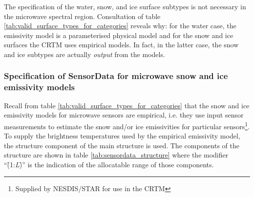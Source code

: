 The specification of the water, snow, and ice surface subtypes is not necessary in the microwave spectral region. Consultation of table \ref{tab:valid_surface_types_for_categories} reveals why: for the water case, the emissivity model is a parameterised physical model and for the snow and ice surfaces the CRTM uses empirical models. In fact, in the latter case, the snow and ice subtypes are actually \emph{output} from the models.



\subsubsection{Specification of SensorData for microwave snow and ice emissivity models}

Recall from table \ref{tab:valid_surface_types_for_categories} that the snow and ice emissivity models for microwave sensors are empirical, i.e. they use input sensor measurements to estimate the snow and/or ice emissivities for particular sensors\footnote{Supplied by NESDIS/STAR for use in the CRTM}. To supply the brightness temperatures used by the empirical emissivity model, the \hyperref[sec:sensordata_structure]{\SensorData} structure component of the main \hyperref[sec:surface_structure]{\Surface} structure is used. The components of the \hyperref[sec:sensordata_structure]{\SensorData} structure are shown in table \ref{tab:sensordata_structure} where the modifier ``\f{(}1:\textit{L}\f{)}'' is the indication of the allocatable range of those components.

